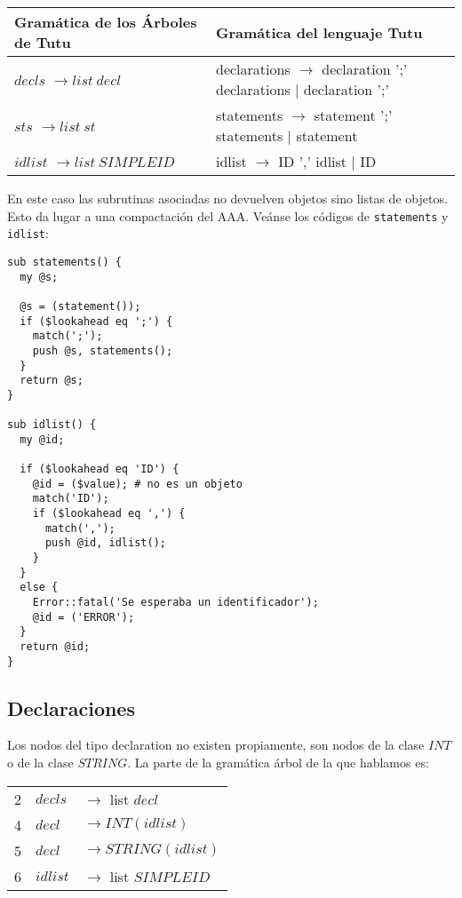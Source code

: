 \vspace{0.25cm}
\begin{center}
\begin{tabular}{|l||l|}
\hline
Gramática de los Árboles de Tutu       & Gramática del lenguaje Tutu\\
\hline
$decls$  $\rightarrow list\ decl$ & declarations $\rightarrow$ declaration  ';'  declarations    $|$ declaration ';'\\
\hline
$sts$    $\rightarrow list\ st$ & statements   $\rightarrow$ statement  ';'  statements        $|$ statement\\
\hline
$idlist$ $\rightarrow list\ SIMPLEID$ & idlist       $\rightarrow$ ID ',' idlist $|$ ID\\
\hline
\end{tabular}
\end{center}

En este caso las subrutinas asociadas no devuelven
objetos sino listas de objetos. 
Esto da lugar a una compactación del AAA.
Veánse los códigos de \verb|statements| y \verb|idlist|:
\begin{verbatim}
sub statements() {
  my @s;

  @s = (statement());
  if ($lookahead eq ';') {
    match(';');
    push @s, statements();
  }
  return @s;
}

sub idlist() {
  my @id;

  if ($lookahead eq 'ID') {
    @id = ($value); # no es un objeto 
    match('ID');
    if ($lookahead eq ',') {
      match(',');
      push @id, idlist();
    }
  }
  else {
    Error::fatal('Se esperaba un identificador');
    @id = ('ERROR');
  }
  return @id;
}
\end{verbatim}

\subsection{Declaraciones}
 Los nodos del tipo declaration no existen propiamente, son nodos 
de la clase $INT$ o de la clase $STRING$. 
La parte de la gramática árbol de la que hablamos es:

\begin{center}
\begin{tabular}{l|ll}
  2 & $decls$  &$\rightarrow$ list $decl$\\
  4 & $decl$   &$\rightarrow INT(idlist)$\\
  5 & $decl$   &$\rightarrow STRING(idlist)$\\
  6 & $idlist$ &$\rightarrow$ list $SIMPLEID$\\
\end{tabular}
\end{center}

